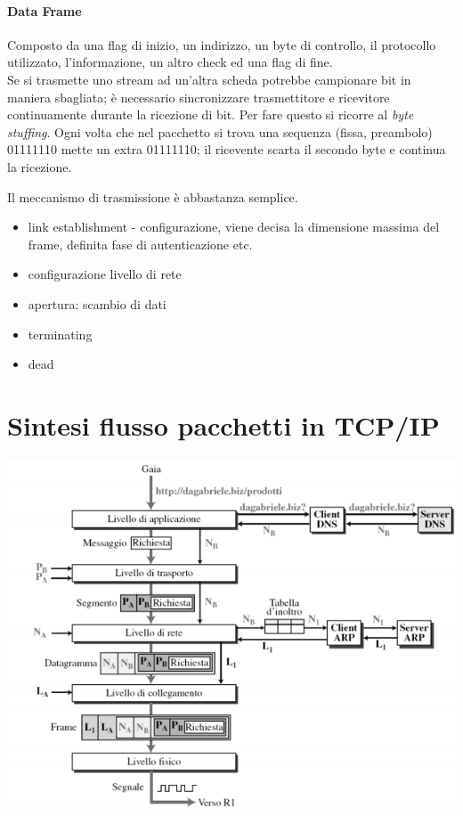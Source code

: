 \paragraph{Data Frame} Composto da una flag di inizio, un indirizzo, un byte di controllo, il protocollo utilizzato, l'informazione, un altro check ed una flag di fine.\\
Se si trasmette uno stream ad un'altra scheda potrebbe campionare bit in maniera sbagliata; è necessario sincronizzare trasmettitore e ricevitore continuamente durante la ricezione di bit. Per fare questo si ricorre al \textit{byte stuffing}.
Ogni volta che nel pacchetto si trova una sequenza (fissa, preambolo) 01111110 mette un extra 01111110; il ricevente scarta il secondo byte e continua la ricezione.

Il meccanismo di trasmissione è abbastanza semplice.
\begin{itemize}
	\item link establishment - configurazione, viene decisa la dimensione massima del frame, definita fase di autenticazione etc.
	\item configurazione livello di rete
	\item apertura: scambio di dati
	\item terminating
	\item dead
\end{itemize}

\section{Sintesi flusso pacchetti in TCP/IP}
\begin{center}
	\includegraphics[width=.7\textwidth]{res/flusso-pacchetti-tcpip.png} \hfill
\end{center}